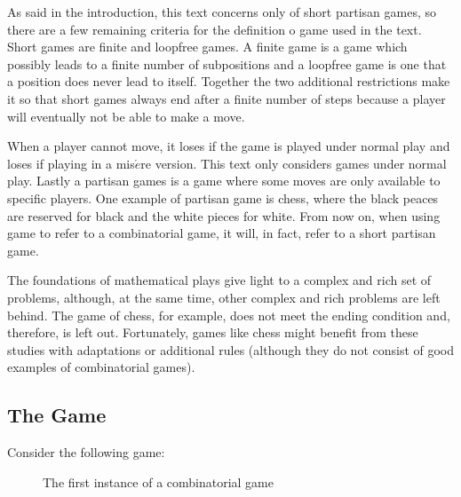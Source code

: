As said in the introduction, this text concerns only of short partisan games, so there are a few remaining criteria for the definition o game used in the text. Short games are finite and loopfree games. A finite game is a game which possibly leads to a finite number of subpositions and a loopfree game is one that a position does never lead to itself. Together the two additional restrictions make it so that short games always end after a finite number of steps because a player will eventually not be able to make a move.

When a player cannot move, it loses if the game is played under normal play and loses if playing in a mis$\acute{e}$re version. This text only considers games under normal play. Lastly a partisan games is a game where some moves are only available to specific players. One example of partisan game is chess, where the black peaces are reserved for black and the white pieces for white. From now on, when using game to refer to a combinatorial game, it will, in fact, refer to a short partisan game.  

The foundations of mathematical plays give light to a complex and rich set of problems, although, at the same time, other complex and rich problems are left behind. The game of chess, for example, does not meet the ending condition and, therefore, is left out. Fortunately, games like chess might benefit from these studies with adaptations or additional rules (although they do not consist of good examples of combinatorial games).\\

\subsection*{The Game}

Consider the following game:\\

\begin{figure} [!ht]
\begin{center}
\end{center}
\caption{The first instance of a combinatorial game}
\end{figure}

